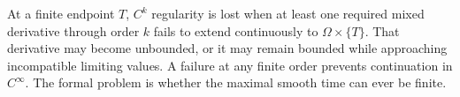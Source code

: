 
At a finite endpoint \(T\), \(C^k\) regularity is lost when at least one required mixed derivative through order \(k\) fails to extend continuously to \(\Omega\times\{T\}\).
That derivative may become unbounded, or it may remain bounded while approaching incompatible limiting values.
A failure at any finite order prevents continuation in \(C^\infty\).
The formal problem is whether the maximal smooth time can ever be finite.


